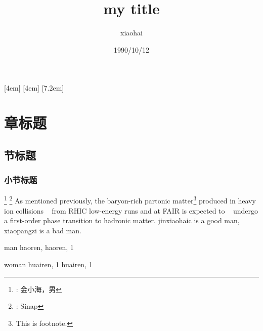\documentclass[11pt,UTF8,hyperref,openany]{ctexbook}
\author{xiaohai}
\date{1990/10/12}
\title{my title}
\begin{document}

\maketitle

[4em]{\addvspace{2.3mm}\bf}{%
  \contentslabel{4.0em}}{}{\titlerule*[5pt]{$\cdot$}\contentspage}
[4em]{}{\contentslabel{2.5em}}{}{%
  \titlerule*[5pt]{$\cdot$}\contentspage}
[7.2em]{}{\contentslabel{3.3em}}{}{%
  \titlerule*[5pt]{$\cdot$}\contentspage}
\tableofcontents

\listoffigures
\listoftables

\chapter{章标题}
\section{节标题}
\subsection{小节标题}

\renewcommand{\thefootnote}{}
\footnote{: 金小海，男}
\footnote{: Sinap}
\setcounter{footnote}{0}
\renewcommand{\thefootnote}{\arabic{footnote}}
As mentioned previously, the baryon-rich partonic matter\footnote{This is footnote.}
produced in heavy ion collisions ~\cite{检索名1} from RHIC low-energy runs and at FAIR 
is expected to ~\cite{检索名2} undergo a first-order phase transition to hadronic 
matter. jinxiaohaic is a good man, xiaopangzi 
is a bad man.

\begin{theindex}
\item man
  \subitem haoren, 
  \subsubitem haoren, 1
  \indexspace
\item woman
  \subitem huairen, 1
  \subsubitem huairen, 1
\end{theindex}
\end{document}
